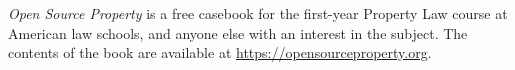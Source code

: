 \emph{Open Source Property} is a free casebook for the first-year Property Law
course at American law schools, and anyone else with an interest in the subject.
The contents of the book are available at \url{https://opensourceproperty.org}.


